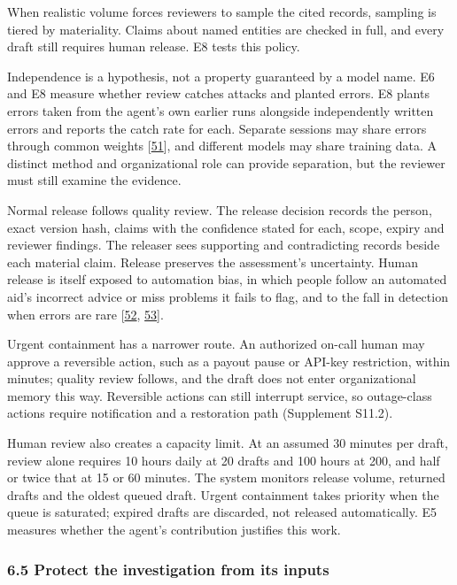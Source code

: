 \documentclass[
  11pt,
]{article}
\begin{document}
When realistic volume forces reviewers to sample the cited records,
sampling is tiered by materiality. Claims about named entities are
checked in full, and every draft still requires human release. E8 tests
this policy.

Independence is a hypothesis, not a property guaranteed by a model name.
E6 and E8 measure whether review catches attacks and planted errors. E8
plants errors taken from the agent's own earlier runs alongside
independently written errors and reports the catch rate for each.
Separate sessions may share errors through common weights
{[}\protect\hyperlink{ref-Bara2026EpistemicSybil}{51}{]}, and different
models may share training data. A distinct method and organizational
role can provide separation, but the reviewer must still examine the
evidence.

Normal release follows quality review. The release decision records the
person, exact version hash, claims with the confidence stated for each,
scope, expiry and reviewer findings. The releaser sees supporting and
contradicting records beside each material claim. Release preserves the
assessment's uncertainty. Human release is itself exposed to automation
bias, in which people follow an automated aid's incorrect advice or miss
problems it fails to flag, and to the fall in detection when errors are
rare {[}\protect\hyperlink{ref-ParasuramanManzey2010}{52},
\protect\hyperlink{ref-Wolfe2005Rare}{53}{]}.

Urgent containment has a narrower route. An authorized on-call human may
approve a reversible action, such as a payout pause or API-key
restriction, within minutes; quality review follows, and the draft does
not enter organizational memory this way. Reversible actions can still
interrupt service, so outage-class actions require notification and a
restoration path (Supplement S11.2).

Human review also creates a capacity limit. At an assumed 30 minutes per
draft, review alone requires 10 hours daily at 20 drafts and 100 hours
at 200, and half or twice that at 15 or 60 minutes. The system monitors
release volume, returned drafts and the oldest queued draft. Urgent
containment takes priority when the queue is saturated; expired drafts
are discarded, not released automatically. E5 measures whether the
agent's contribution justifies this work.

\hypertarget{protect-the-investigation-from-its-inputs}{%
\subsubsection{6.5 Protect the investigation from its
inputs}\label{protect-the-investigation-from-its-inputs}}
\end{document}
